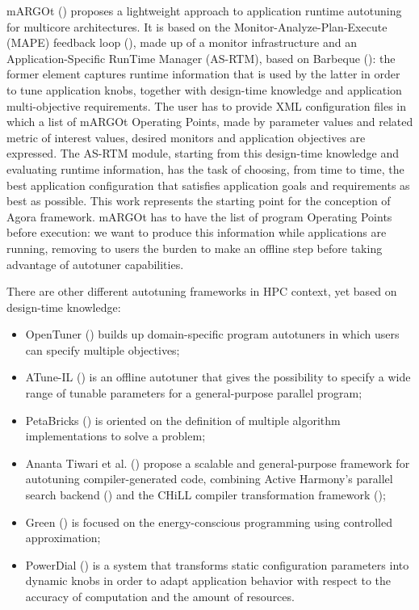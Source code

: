 mARGOt (\cite{gadioli2015application}) proposes a lightweight approach to application runtime autotuning for multicore architectures. It is based on the Monitor-Analyze-Plan-Execute (MAPE) feedback loop (\cite{kephart2003vision}), made up of a monitor infrastructure and an Application-Specific RunTime Manager (AS-RTM), based on Barbeque \hbox{(\cite{bellasi2012rtrm})}: the former element captures runtime information that is used by the latter in order to tune application knobs, together with design-time knowledge and application multi-objective requirements. The user has to provide XML configuration files in which a list of mARGOt Operating Points, made by parameter values and related metric of interest values, desired monitors and application objectives are expressed. The AS-RTM module, starting from this design-time knowledge and evaluating runtime information, has the task of choosing, from time to time, the best application configuration that satisfies application goals and requirements as best as possible. This work represents the starting point for the conception of Agora framework. mARGOt has to have the list of program Operating Points before execution: we want to produce this information while applications are running, removing to users the burden to make an offline step before taking advantage of autotuner capabilities.

There are other different autotuning frameworks in HPC context, yet based on design-time knowledge: 

\begin{itemize}

	\item OpenTuner (\cite{ansel2014opentuner}) builds up domain-specific program autotuners in which users can specify multiple objectives;
	
	\item ATune-IL (\cite{schaefer2009atune}) is an offline autotuner that gives the possibility to specify a wide range of tunable parameters for a general-purpose parallel program;

	\item PetaBricks (\cite{ansel2009petabricks}) is oriented on the definition of multiple algorithm implementations to solve a problem;

	\item Ananta Tiwari et al. (\cite{tiwari2009scalable}) propose a scalable and general-purpose framework for autotuning compiler-generated code, combining Active Harmony's parallel search backend (\cite{chung2004using}) and the CHiLL compiler transformation framework (\cite{chen2008chill});

	\item Green (\cite{baek2010green}) is focused on the energy-conscious programming using controlled approximation;

	\item PowerDial (\cite{hoffmann2011dynamic}) is a system that transforms static configuration parameters into dynamic knobs in order to adapt application behavior with respect to the accuracy of computation and the amount of resources.

\end{itemize}

